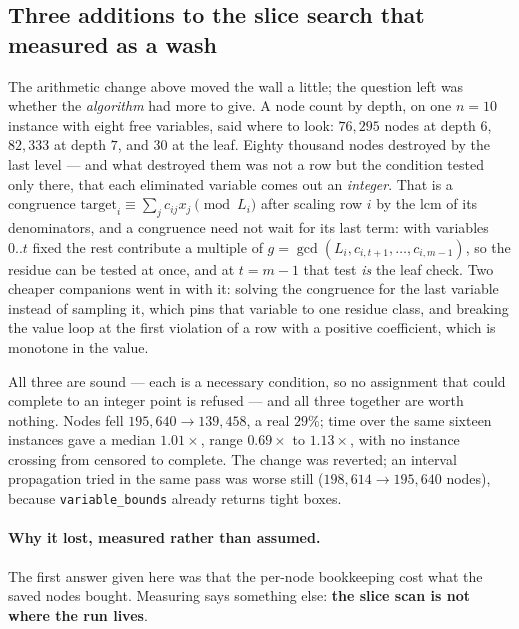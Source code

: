 \documentclass[11pt,a4paper]{article}
\begin{document}
\subsection{Three additions to the slice search that measured as a wash}

The arithmetic change above moved the wall a little; the question left was
whether the \emph{algorithm} had more to give.  A node count by depth, on one
$n=10$ instance with eight free variables, said where to look: $76{,}295$ nodes
at depth $6$, $82{,}333$ at depth $7$, and \textbf{$30$} at the leaf.  Eighty
thousand nodes destroyed by the last level --- and what destroyed them was not
a row but the condition tested only there, that each eliminated variable comes
out an \emph{integer}.  That is a congruence
$\mathrm{target}_i \equiv \sum_j c_{ij}x_j \pmod{L_i}$ after scaling row $i$ by
the lcm of its denominators, and a congruence need not wait for its last term:
with variables $0..t$ fixed the rest contribute a multiple of
$g = \gcd(L_i, c_{i,t+1},\dots,c_{i,m-1})$, so the residue can be tested at
once, and at $t = m-1$ that test \emph{is} the leaf check.  Two cheaper
companions went in with it: solving the congruence for the last variable
instead of sampling it, which pins that variable to one residue class, and
breaking the value loop at the first violation of a row with a positive
coefficient, which is monotone in the value.

All three are sound --- each is a necessary condition, so no assignment that
could complete to an integer point is refused --- and all three together are
worth nothing.  Nodes fell $195{,}640 \to 139{,}458$, a real $29\%$; time over
the same sixteen instances gave a median $\mathbf{1.01\times}$, range
$0.69\times$ to $1.13\times$, with no instance crossing from censored to
complete.  The change was reverted; an interval propagation tried in the same
pass was worse still ($198{,}614 \to 195{,}640$ nodes), because
\texttt{variable\_bounds} already returns tight boxes.

\paragraph{Why it lost, measured rather than assumed.}
The first answer given here was that the per-node bookkeeping cost what the
saved nodes bought.  Measuring says something else: \textbf{the slice scan is
not where the run lives}.
\end{document}
